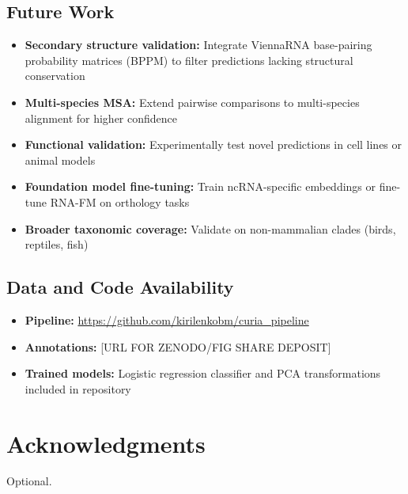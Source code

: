 \documentclass[11pt]{article}
\begin{document}
\subsection{Future Work}
\begin{itemize}
\item \textbf{Secondary structure validation:} Integrate ViennaRNA base-pairing probability matrices (BPPM) to filter predictions lacking structural conservation
\item \textbf{Multi-species MSA:} Extend pairwise comparisons to multi-species alignment for higher confidence
\item \textbf{Functional validation:} Experimentally test novel predictions in cell lines or animal models
\item \textbf{Foundation model fine-tuning:} Train ncRNA-specific embeddings or fine-tune RNA-FM on orthology tasks
\item \textbf{Broader taxonomic coverage:} Validate on non-mammalian clades (birds, reptiles, fish)
\end{itemize}

\subsection{Data and Code Availability}
\begin{itemize}
\item \textbf{Pipeline:} \url{https://github.com/kirilenkobm/curia_pipeline}
\item \textbf{Annotations:} [URL FOR ZENODO/FIG SHARE DEPOSIT]
\item \textbf{Trained models:} Logistic regression classifier and PCA transformations included in repository
\end{itemize}

\section*{Acknowledgments}
Optional.



\end{document}
